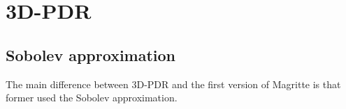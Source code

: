 \documentclass[]{article}
\begin{document}
\newpage




\newpage

\appendix

\section{3D-PDR}

\subsection{Sobolev approximation}

The main difference between 3D-PDR and the first version of Magritte is that former used the Sobolev approximation.
\end{document}
